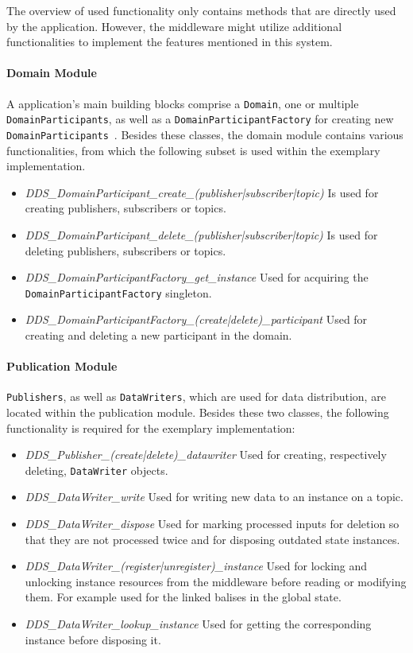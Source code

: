 The overview of used functionality only contains methods that are directly used by the application.
However, the middleware might utilize additional functionalities to implement the features mentioned in this system.

\paragraph{Domain Module}
A  application's main building blocks comprise a \texttt{Domain}, one or multiple \texttt{DomainParticipants}, as well as a \texttt{DomainParticipantFactory} for creating new \texttt{DomainParticipants}~\cite{omgDDSspec}.
Besides these classes, the domain module contains various functionalities, from which the following subset is used within the exemplary implementation.

\begin{itemize}
\item \textit{DDS\_DomainParticipant\_create\_(publisher|subscriber|topic)} Is used for creating  publishers, subscribers or topics.
\item \textit{DDS\_DomainParticipant\_delete\_(publisher|subscriber|topic)} Is used for deleting  publishers, subscribers or topics.
\item \textit{DDS\_DomainParticipantFactory\_get\_instance} Used for acquiring the \texttt{DomainParticipantFactory} singleton.
\item \textit{DDS\_DomainParticipantFactory\_(create|delete)\_participant} Used for creating and deleting a new participant in the  domain.
\end{itemize}


\paragraph{Publication Module}
\texttt{Publishers}, as well as \texttt{DataWriters}, which are used for data distribution, are located within the publication module.
Besides these two classes, the following functionality is required for the exemplary implementation:

\begin{itemize}
\item \textit{DDS\_Publisher\_(create|delete)\_datawriter} Used for creating, respectively deleting, \texttt{DataWriter} objects.
\item \textit{DDS\_DataWriter\_write} Used for writing new data to an instance on a  topic.
\item \textit{DDS\_DataWriter\_dispose} Used for marking processed inputs for deletion so that they are not processed twice and for disposing outdated state instances.
\item \textit{DDS\_DataWriter\_(register|unregister)\_instance} Used for locking and unlocking instance resources from the middleware before reading or modifying them. For example used for the linked balises in the global state.
\item \textit{DDS\_DataWriter\_lookup\_instance} Used for getting the corresponding instance before disposing it.
\end{itemize}


